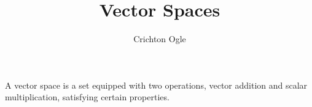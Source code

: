 \documentclass{ximera}
\title{Vector Spaces}
\author{Crichton Ogle}
\begin{document}
\begin{abstract}
\end{abstract}
\maketitle

A vector space is a set equipped with two operations, vector addition
and scalar multiplication, satisfying certain properties.
\end{document}
